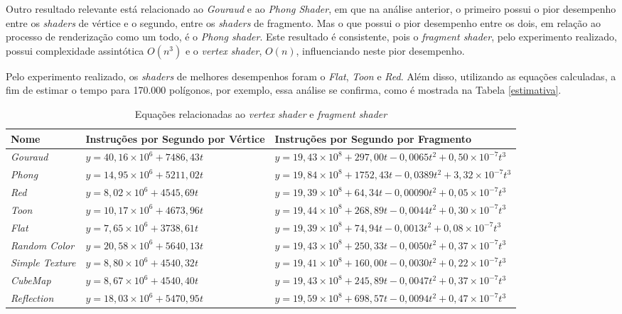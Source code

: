 	Outro resultado relevante está relacionado ao \textit{Gouraud} e ao \textit{Phong Shader}, em que na análise anterior, o primeiro possui o pior desempenho entre os \textit{shaders} de vértice e o segundo, entre os \textit{shaders} de fragmento.  Mas o que possui o pior desempenho entre os dois, em relação ao processo de renderização como um todo, é o \textit{Phong shader}. Este resultado é consistente, pois o \textit{fragment shader}, pelo experimento realizado, possui complexidade assintótica $O(n^3)$ e o \textit{vertex shader}, $O(n)$, influenciando neste pior desempenho. 

	Pelo experimento realizado, os \textit{shaders} de melhores desempenhos foram o \textit{Flat}, \textit{Toon} e \textit{Red}. Além disso, utilizando as equações calculadas, a fim de estimar o tempo para 170.000 polígonos, por exemplo, essa análise se confirma, como é mostrada na Tabela \ref{estimativa}.

	\begin{table}[ht]
	\centering	
	\begin{tabularx}{0.9\textwidth}{lXX}
		\toprule
		\textbf{Nome} & \textbf{Instruções por Segundo por Vértice} & \textbf{Instruções por Segundo por Fragmento}  \\
		\midrule
		\textit{Gouraud} & $y = 40,16 \times 10^6 + 7486,43t$ & $y = 19,43 \times 10 ^8 + 297,00t - 0,0065t^2 + 0,50 \times 10^{-7}t^3 $  \\
		\textit{Phong} &  $y = 14,95 \times 10^6 + 5211,02t$ & $y = 19,84 \times 10^8 + 1752,43t - 0,0389t^2 + 3,32 \times 10^{-7}t^3$ \\
		\textit{Red} & $y = 8,02 \times 10^6 + 4545,69t$ & $y = 19,39 \times 10 ^8 + 64,34t - 0,00090t^2 + 0,05 \times 10^{-7}t^3$\\
		\textit{Toon} & $y = 10,17 \times 10^6 + 4673,96t$ & $y = 19,44 \times 10 ^8 + 268,89t - 0,0044t^2 + 0,30 \times 10^{-7}t^3$\\
		\textit{Flat} & $y = 7,65 \times 10^6 + 3738,61t$ & $y = 19,39 \times 10 ^8 + 74,94t - 0,0013t^2 + 0,08 \times 10^{-7}t^3$ \\
		\textit{Random Color} & $y = 20,58 \times 10^6 + 5640,13t$ & $y = 19,43 \times 10 ^8 + 250,33t - 0,0050t^2 + 0,37 \times 10^{-7}t^3$\\
		\textit{Simple Texture} & $y = 8,80 \times 10^6 + 4540,32t$ & $y = 19,41 \times 10 ^8 + 160,00t - 0,0030t^2 + 0,22 \times 10^{-7}t^3$\\
		\textit{CubeMap} & $y = 8,67 \times 10^6 + 4540,40t$ & $y = 19,43 \times 10 ^8 + 245,89t - 0,0047t^2 + 0,37 \times 10^{-7}t^3$ \\
		\textit{Reflection} & $y = 18,03 \times 10^6 + 5470,95t$ & $y = 19,59 \times 10 ^8 + 698,57t - 0,0094t^2 + 0,47 \times 10^{-7}t^3$ \\
	
		\bottomrule
	\end{tabularx}
	\caption{Equações relacionadas ao \textit{vertex shader} e \textit{fragment shader}}
	\label{equacoes}
	\end{table}

